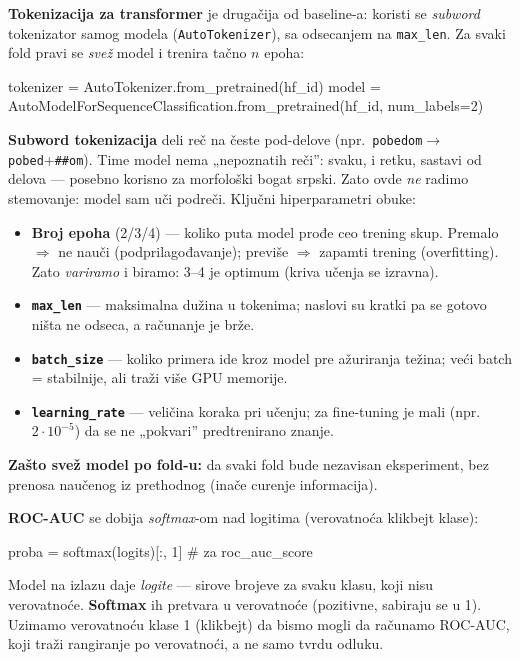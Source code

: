 \documentclass[11pt,a4paper]{article}
\newcommand{\kod}[1]{\texttt{#1}}
\begin{document}
\textbf{Tokenizacija za transformer} je drugačija od baseline-a: koristi se
\emph{subword} tokenizator samog modela (\kod{AutoTokenizer}), sa odsecanjem na
\kod{max\_len}. Za svaki fold pravi se \emph{svež} model i trenira tačno $n$ epoha:
\begin{code}
tokenizer = AutoTokenizer.from_pretrained(hf_id)
model = AutoModelForSequenceClassification.from_pretrained(hf_id, num_labels=2)
\end{code}

\begin{teorija}
\textbf{Subword tokenizacija} deli reč na česte pod-delove (npr.\ \kod{pobedom}$\to$
\kod{pobed}+\kod{\#\#om}). Time model nema „nepoznatih reči'': svaku, i retku, sastavi
od delova --- posebno korisno za morfološki bogat srpski. Zato ovde \emph{ne} radimo
stemovanje: model sam uči podreči. Ključni hiperparametri obuke:
\begin{itemize}[nosep]
  \item \textbf{Broj epoha} (2/3/4) --- koliko puta model prođe ceo trening skup.
    Premalo $\Rightarrow$ ne nauči (podprilagođavanje); previše $\Rightarrow$ zapamti
    trening (overfitting). Zato \emph{variramo} i biramo: 3--4 je optimum (kriva učenja
    se izravna).
  \item \textbf{\kod{max\_len}} --- maksimalna dužina u tokenima; naslovi su kratki pa
    se gotovo ništa ne odseca, a računanje je brže.
  \item \textbf{\kod{batch\_size}} --- koliko primera ide kroz model pre ažuriranja
    težina; veći batch = stabilnije, ali traži više GPU memorije.
  \item \textbf{\kod{learning\_rate}} --- veličina koraka pri učenju; za fine-tuning je
    mali (npr.\ $2\!\cdot\!10^{-5}$) da se ne „pokvari'' predtrenirano znanje.
\end{itemize}
\textbf{Zašto svež model po fold-u:} da svaki fold bude nezavisan eksperiment, bez
prenosa naučenog iz prethodnog (inače curenje informacija).
\end{teorija}

\textbf{ROC-AUC} se dobija \emph{softmax}-om nad logitima (verovatnoća klikbejt klase):
\begin{code}
proba = softmax(logits)[:, 1]   # za roc_auc_score
\end{code}
\begin{teorija}
Model na izlazu daje \emph{logite} --- sirove brojeve za svaku klasu, koji nisu
verovatnoće. \textbf{Softmax} ih pretvara u verovatnoće (pozitivne, sabiraju se u 1).
Uzimamo verovatnoću klase 1 (klikbejt) da bismo mogli da računamo ROC-AUC, koji traži
rangiranje po verovatnoći, a ne samo tvrdu odluku.
\end{teorija}
\end{document}

